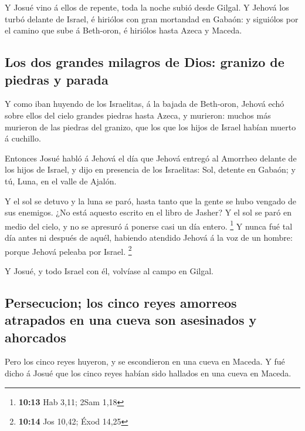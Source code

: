  Y Josué vino á ellos de repente, toda la noche subió desde
Gilgal.  Y Jehová los turbó delante de Israel, é hiriólos
con gran mortandad en Gabaón: y siguiólos por el camino que sube á
Beth-oron, é hiriólos hasta Azeca y Maceda.

\hypertarget{los-dos-grandes-milagros-de-dios-granizo-de-piedras-y-parada}{%
\subsection{Los dos grandes milagros de Dios: granizo de piedras y
parada}\label{los-dos-grandes-milagros-de-dios-granizo-de-piedras-y-parada}}

 Y como iban huyendo de los Israelitas, á la bajada de
Beth-oron, Jehová echó sobre ellos del cielo grandes piedras hasta
Azeca, y murieron: muchos más murieron de las piedras del granizo, que
los que los hijos de Israel habían muerto á cuchillo.

 Entonces Josué habló á Jehová el día que Jehová entregó al
Amorrheo delante de los hijos de Israel, y dijo en presencia de los
Israelitas: Sol, detente en Gabaón; y tú, Luna, en el valle de Ajalón.

 Y el sol se detuvo y la luna se paró, hasta tanto que la
gente se hubo vengado de sus enemigos. ¿No está aquesto escrito en el
libro de Jasher? Y el sol se paró en medio del cielo, y no se apresuró á
ponerse casi un día entero. \footnote{\textbf{10:13} Hab 3,11; 2Sam 1,18}
 Y nunca fué tal día antes ni después de aquél, habiendo
atendido Jehová á la voz de un hombre: porque Jehová peleaba por Israel.
\footnote{\textbf{10:14} Jos 10,42; Éxod 14,25}

 Y Josué, y todo Israel con él, volvíase al campo en
Gilgal.

\hypertarget{persecucion-los-cinco-reyes-amorreos-atrapados-en-una-cueva-son-asesinados-y-ahorcados}{%
\subsection{Persecucion; los cinco reyes amorreos atrapados en una cueva
son asesinados y
ahorcados}\label{persecucion-los-cinco-reyes-amorreos-atrapados-en-una-cueva-son-asesinados-y-ahorcados}}

 Pero los cinco reyes huyeron, y se escondieron en una
cueva en Maceda.  Y fué dicho á Josué que los cinco reyes
habían sido hallados en una cueva en Maceda.

